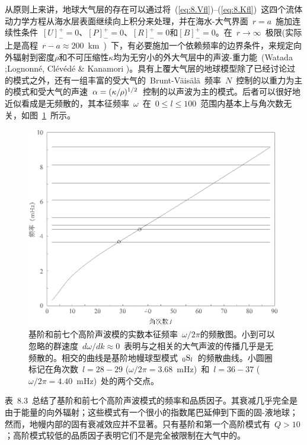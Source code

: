{从原则上来讲，地球大气层的存在可以通过将~(\ref{eq:8.Vfl})--(\ref{eq:8.Kfl})~这四个流体动力学方程从海水层表面继续向上积分来处理，并在海水-大气界面~$r=a$~施加连续性条件~$[U]^+_-=0$、$[P]^+_-=0$、$[R]^+_-=0$和$[B]^+_-=0$。在~$r\rightarrow\infty$~极限(实际上是高程~$r-a\approx 200$~km~)~下，有必要施加一个依赖频率的边界条件，来规定向外辐射到密度$\rho$和不可压缩性$\kappa$均为无穷小的外大气层中的声波-重力能~(Watada \citeyear{watada95};Lognonn\'{e}, Cl\'{e}v\'{e}d\'{e} \& Kanamori
\citeyear{lognonne&al98})。具有上覆大气层的地球模型除了已经讨论过的模式之外，还有一组丰富的受大气的~Brunt-V\"{a}is\"{a}l\"{a}~频率~$N$~控制的以重力为主的模式和受大气的声速~$\alpha =(\kappa/\hspace{-0.2 mm}\rho)^{1/2}$~控制的以声波为主的模式。后者可以很好地近似看成是无频散的，其本征频率~$\omega$~在~$0\leq l\leq 100$~范围内基本上与角次数无关，如图~\ref{8.fig.atmodes}~所示。
\begin{figure}[!t]
\begin{center}
\includegraphics{../figures/chap08/fig22.eps}
\end{center}
\caption[atmospheric modes]{\label{8.fig.atmodes}
基阶和前七个高阶声波模的实数本征频率~$\omega/2\pi$的频散图。小到可以忽略的群速度~$d\omega/dk\approx 0$~表明与之相关的大气声波的传播几乎是无频散的。相交的曲线是基阶地幔球型模式~${}_0{\rm S}_l$~的频散曲线。小圆圈标记在角次数~$l=28\!-\!29$ ($\omega/2\pi= 3.68$~mHz)~和~$l=36\!-\!37$ ($\omega/2\pi= 4.40$~mHz)~处的两个交点。
}
\end{figure}
表~8.3~总结了基阶和前七个高阶声波模式的频率和品质因子。其衰减几乎完全是由于能量的向外辐射；这些模式有一个很小的指数尾巴延伸到下面的固-液地球；然而，地幔内部的固有衰减效应并不显著。只有基阶和第一个高阶模式有~$Q>10$；高阶模式较低的品质因子表明它们不是完全被限制在大气中的。

}
